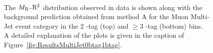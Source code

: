 \begin{figure}[!htb] \centering
{}\\
\caption{ The $M_\mathrm{R}$-$\mathrm{R}^2$ distribution observed in data is shown along with the background prediction
obtained from method A for the Muon Multi-Jet event category in the 2 \PQb-tag (top) and $\geq 3$ \PQb-tag (bottom) bins. 
A detailed explanation of the plots is given in the caption of
  Figure~\ref{fig:ResultsMultiJet0btag1btag}.
}
\label{fig:ResultsMuMultiJet2btag3btag}
\end{figure}

